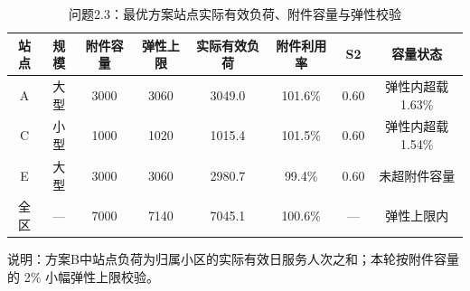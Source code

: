 \begin{table}[htbp]
\centering
\caption{问题2.3：最优方案站点实际有效负荷、附件容量与弹性校验}
\begin{tabular}{|c|c|c|c|c|c|c|c|}
\hline
站点 & 规模 & 附件容量 & 弹性上限 & 实际有效负荷 & 附件利用率 & S2 & 容量状态 \\
\hline
A & 大型 & 3000 & 3060 & 3049.0 & 101.6\% & 0.60 & 弹性内超载1.63\% \\
C & 小型 & 1000 & 1020 & 1015.4 & 101.5\% & 0.60 & 弹性内超载1.54\% \\
E & 大型 & 3000 & 3060 & 2980.7 & 99.4\% & 0.60 & 未超附件容量 \\
\hline
全区 & — & 7000 & 7140 & 7045.1 & 100.6\% & — & 弹性上限内 \\
\hline
\end{tabular}
\vspace{0.2cm}
说明：方案B中站点负荷为归属小区的实际有效日服务人次之和；本轮按附件容量的 2\% 小幅弹性上限校验。
\end{table}
